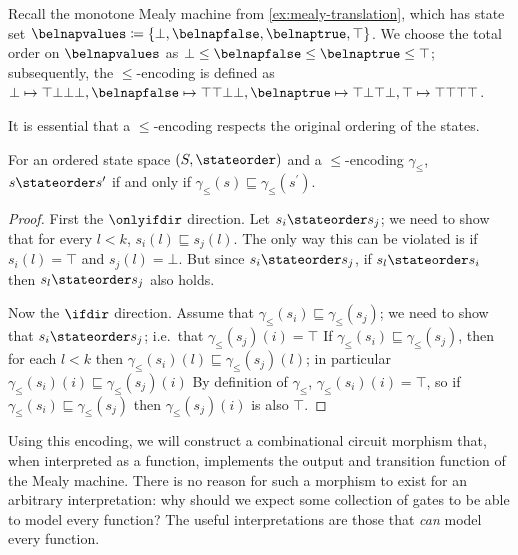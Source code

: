 \begin{example}
    Recall the monotone Mealy machine from \cref{ex:mealy-translation}, which
    has state set \(
    \belnapvalues \coloneqq \{\bot,\belnapfalse,\belnaptrue,\top\}
    \).
    We choose the total order on \(\belnapvalues\) as
    \(\bot \leq \belnapfalse \leq \belnaptrue \leq \top\); subsequently, the
    \(\leq\)-encoding is defined as \(
    \bot \mapsto \top\bot\bot\bot, \belnapfalse \mapsto \top\top\bot\bot,
    \belnaptrue \mapsto \top\bot\top\bot, \top \mapsto \top\top\top\top
    \).
\end{example}

It is essential that a \(\leq\)-encoding respects the original ordering of the
states.

\begin{lemma}
    For an ordered state space \((S,\stateorder)\) and a \(\leq\)-encoding
    \(\gamma_\leq\), \(s \stateorder s^\prime\) if and only if
    \(\gamma_\leq(s) \sqsubseteq \gamma_\leq(s^\prime)\).
\end{lemma}
\begin{proof}
    First the \(\onlyifdir\) direction.
    Let \(s_i \stateorder s_j\); we need to show that for every \(l < k\),
    \(s_i(l) \sqsubseteq s_j(l)\).
    The only way this can be violated is if \(s_i(l) = \top\) and
    \(s_j(l) = \bot\).
    But since \(s_i \stateorder s_j\), if \(s_l \stateorder s_i\) then
    \(s_l \stateorder s_j\) also holds.

    Now the \(\ifdir\) direction.
    Assume that \(\gamma_\leq(s_i) \sqsubseteq \gamma_\leq(s_j)\); we need to
    show that \(s_i \stateorder s_j\); i.e.\ that \(\gamma_\leq(s_j)(i) = \top\)
    If \(\gamma_\leq(s_i) \sqsubseteq \gamma_\leq(s_j)\), then for each
    \(l < k\) then \(\gamma_\leq(s_i)(l) \sqsubseteq \gamma_\leq(s_j)(l)\);
    in particular \(\gamma_\leq(s_i)(i) \sqsubseteq \gamma_\leq(s_j)(i)\)
    By definition of \(\gamma_\leq\), \(\gamma_\leq(s_i)(i) = \top\), so if
    \(\gamma_\leq(s_i) \sqsubseteq \gamma_\leq(s_j)\) then
    \(\gamma_\leq(s_j)(i)\) is also \(\top\).
\end{proof}

Using this encoding, we will construct a combinational circuit morphism that,
when interpreted as a function, implements the output and transition function
of the Mealy machine.
There is no reason for such a morphism to exist for an arbitrary interpretation:
why should we expect some collection of gates to be able to model every
function?
The useful interpretations are those that \emph{can} model every function.

